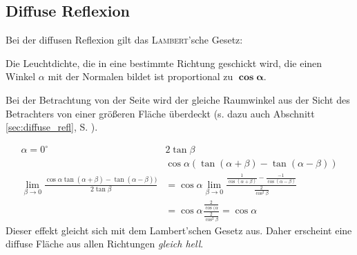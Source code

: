 \subsection{Diffuse Reflexion}
Bei der diffusen Reflexion gilt das \textsc{Lambert}'sche Gesetz:
\begin{center}
\end{center}
Die Leuchtdichte, die in eine bestimmte Richtung geschickt wird, die einen Winkel $\alpha$ mit der Normalen bildet
ist proportional zu $\boldsymbol{\cos \alpha}$.
\begin{center}
\end{center}
Bei der Betrachtung von der Seite wird der gleiche Raumwinkel aus der Sicht des Betrachters von einer größeren Fläche
überdeckt (s. dazu auch Abschnitt \ref{sec:diffuse_refl}, S. \pageref{lambert}).
\begin{center}
\end{center}
\begin{align*}
 \alpha = 0^\circ \qquad & 2 \tan \beta\\
	& \cos \alpha (\tan (\alpha + \beta) - \tan(\alpha - \beta))\\
 \lim_{\beta \to 0} \frac{\cos \alpha \tan (\alpha + \beta) - \tan(\alpha - \beta))}{2 \tan \beta}
	&= \cos \alpha  \lim_{\beta \to 0} \frac{\frac{1}{\cos (\alpha + \beta)} - \frac{-1}{\cos (\alpha - \beta)}}
		{\frac{2}{\cos^2 \beta}}\\
	&= \cos \alpha \frac{\frac{2}{\cos (\alpha}}
		{\frac{2}{\cos^2 \beta}} = \cos \alpha	
\end{align*}
Dieser effekt gleicht sich mit dem Lambert'schen Gesetz aus. Daher erscheint eine diffuse Fläche aus allen Richtungen
\emph{gleich hell}.\\
